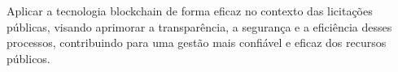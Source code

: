 Aplicar a tecnologia blockchain de forma eficaz no contexto das licitações públicas, visando aprimorar a transparência, a segurança e a eficiência desses processos, contribuindo para uma gestão mais confiável e eficaz dos recursos públicos.